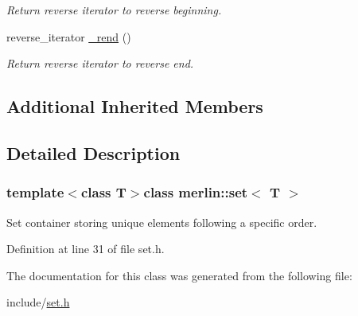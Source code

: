 \begin{DoxyCompactItemize}
\begin{DoxyCompactList}\small\item\em Return reverse iterator to reverse beginning. \end{DoxyCompactList}\item 
\hypertarget{classmerlin_1_1set_a5ab9d534c39d7ae4875598e2ee4b9174}{}reverse\+\_\+iterator \hyperlink{classmerlin_1_1set_a5ab9d534c39d7ae4875598e2ee4b9174}{\+\_\+rend} ()\label{classmerlin_1_1set_a5ab9d534c39d7ae4875598e2ee4b9174}

\begin{DoxyCompactList}\small\item\em Return reverse iterator to reverse end. \end{DoxyCompactList}\end{DoxyCompactItemize}
\subsection*{Additional Inherited Members}


\subsection{Detailed Description}
\subsubsection*{template$<$class T$>$class merlin\+::set$<$ T $>$}

Set container storing unique elements following a specific order. 

Definition at line 31 of file set.\+h.



The documentation for this class was generated from the following file\+:\begin{DoxyCompactItemize}
\item 
include/\hyperlink{set_8h}{set.\+h}\end{DoxyCompactItemize}
